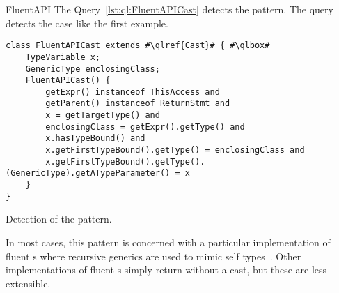 \begin{pattern}{FluentAPI}
\detection{}
The Query~\ref{lst:ql:FluentAPICast} detects the \thisp{} pattern.
The query detects the case like the first example.

\begin{listing}
\begin{verbatim}
class FluentAPICast extends #\qlref{Cast}# { #\qlbox#
	TypeVariable x;
	GenericType enclosingClass;
	FluentAPICast() {
		getExpr() instanceof ThisAccess and
		getParent() instanceof ReturnStmt and
		x = getTargetType() and
		enclosingClass = getExpr().getType() and
		x.hasTypeBound() and
		x.getFirstTypeBound().getType() = enclosingClass and
		x.getFirstTypeBound().getType().(GenericType).getATypeParameter() = x
	}
}
\end{verbatim}
\caption{Detection of the \thisp{} pattern.}
\label{lst:ql:FluentAPICast}
\end{listing}

\issues{}
In most cases,
this pattern is concerned with a particular implementation of fluent \api{}s
where recursive generics are used to mimic self types~\citep{bruceChallengingTypingIssues2003}.
Other implementations of fluent \api{}s simply return  without a cast, but these are less extensible.

\end{pattern}
